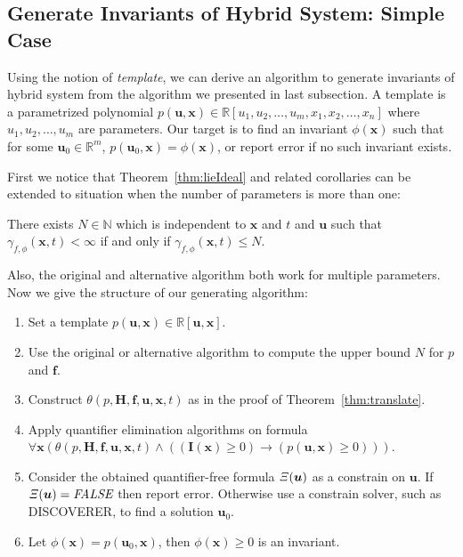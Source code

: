 \documentclass{jssc}
\begin{document}
\subsection{Generate Invariants of Hybrid System: Simple Case}
Using the notion of \emph{template}, we can derive an algorithm to generate invariants of hybrid system from the algorithm we presented in last subsection. A template is a parametrized polynomial $p(\boldsymbol{u}, \boldsymbol{x}) \in \mathbb{R}[u_1, u_2, \dots, u_m, x_1, x_2, \dots, x_n]$ where $u_1, u_2, \dots, u_m$ are parameters. Our target is to find an invariant $\phi(\boldsymbol{x})$ such that for some $\boldsymbol{u}_0 \in \mathbb{R}^m$, $p(\boldsymbol{u}_0, \boldsymbol{x}) = \phi(\boldsymbol{x})$, or report error if no such invariant exists.

First we notice that Theorem~\ref{thm:lieIdeal} and related corollaries can be extended to situation when the number of parameters is more than one: 
\begin{lemma}
\label{cor:paraLieRank}
There exists $N \in \mathbb{N}$ which is independent to $\boldsymbol{x}$ and $t$ and $\boldsymbol{u}$ such that $\gamma_{f, \phi}(\boldsymbol{x}, t) < \infty$ if and only if $\gamma_{f, \phi}(\boldsymbol{x}, t) \leq N$.
\end{lemma}
Also, the original and alternative algorithm both work for multiple parameters. Now we give the structure of our generating algorithm:
\begin{enumerate}
	\item Set a template $p(\boldsymbol{u}, \boldsymbol{x}) \in \mathbb{R}[\boldsymbol{u},\boldsymbol{x}]$.
	\item Use the original or alternative algorithm to compute the upper bound $N$ for $p$ and $\boldsymbol{f}$.
	\item Construct $\theta(p ,\boldsymbol{H}, \boldsymbol{f},\boldsymbol{u}, \boldsymbol{x}, t)$ as in the proof of Theorem~\ref{thm:translate}.
	\item Apply quantifier elimination algorithms on formula $\forall \boldsymbol{x} (\theta(p, \boldsymbol{H}, \boldsymbol{f}, \boldsymbol{u}, \boldsymbol{x}, t) \wedge ((\boldsymbol{I}(\boldsymbol{x}) \geq 0) \rightarrow (p(\boldsymbol{u}, \boldsymbol{x}) \geq 0)))$.
	\item Consider the obtained quantifier-free formula ${\it \Xi}(\boldsymbol{u})$ as a constrain on $\boldsymbol{u}$. If ${\it \Xi}(\boldsymbol{u}) = \textit{FALSE}$ then report error. Otherwise use a constrain solver, such as DISCOVERER\cite{xia2007discoverer}, to find a solution $\boldsymbol{u}_0$.
	\item Let $\phi(\boldsymbol{x}) = p(\boldsymbol{u}_0, \boldsymbol{x})$, then $\phi(\boldsymbol{x}) \geq 0$ is an invariant.
\end{enumerate}
\end{document}
